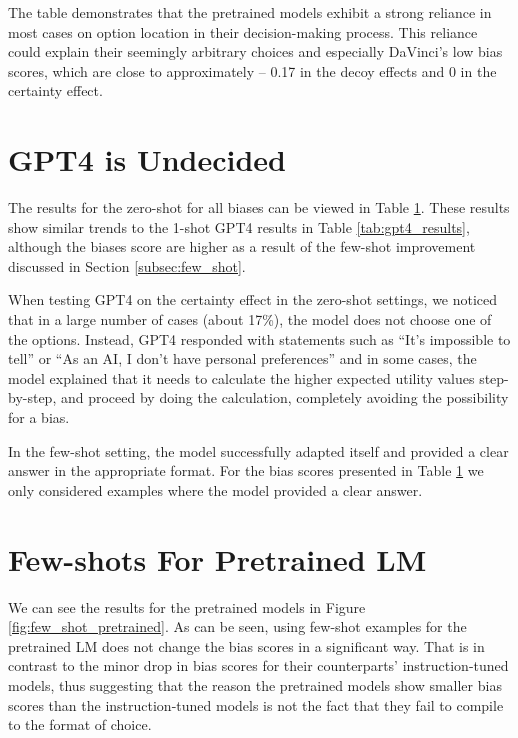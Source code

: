 The table demonstrates that the pretrained models exhibit a strong reliance in most cases on option location in their decision-making process.
This reliance could explain their seemingly arbitrary choices and especially DaVinci's low bias scores, which are close to approximately -- 0.17 in the decoy effects and 0 in the certainty effect.


\section{GPT4 is Undecided}
\label{appendix:gpt4_zero-shot}
The results for the zero-shot for all biases can be viewed in Table \ref{appendix:gpt4_zero-shot}.
These results show similar trends to the 1-shot GPT4 results in Table \ref{tab:gpt4_results}, although the biases score are higher as a result of the few-shot improvement discussed in Section \ref{subsec:few_shot}.

When testing GPT4 on the certainty effect in the zero-shot settings, we noticed that in a large number of cases (about 17\%), the model does not choose one of the options. 
Instead, GPT4 responded with statements such as ``It's impossible to tell'' or ``As an AI, I don't have personal preferences'' and in some cases, the model explained that it needs to calculate the higher expected utility values step-by-step, and proceed by doing the calculation, completely avoiding the possibility for a bias.

In the few-shot setting, the model successfully adapted itself and provided a clear answer in the appropriate format.
For the bias scores presented in Table \ref{appendix:gpt4_zero-shot} we only considered examples where the model provided a clear answer. 




\section{Few-shots For Pretrained LM}
\label{appendix:sec:few_shot_pretrained}

We can see the results for the pretrained models in Figure \ref{fig:few_shot_pretrained}.
As can be seen, using few-shot examples for the pretrained LM does not change the bias scores in a significant way.
That is in contrast to the minor drop in bias scores for their counterparts' instruction-tuned models, thus suggesting that the reason the pretrained models show smaller bias scores than the instruction-tuned models is not the fact that they fail to compile to the format of choice.


